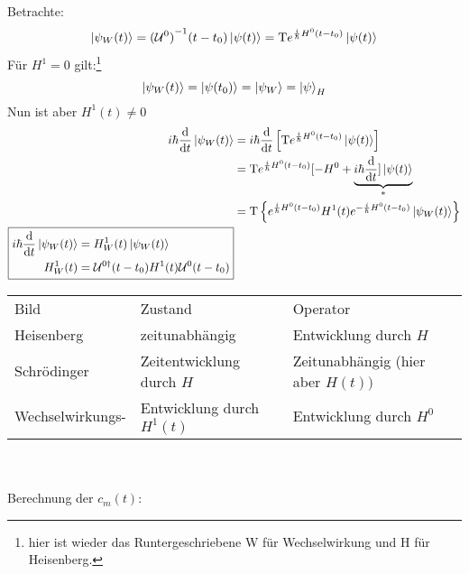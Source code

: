 	Betrachte:
		\begin{equation*}
			\ket{\psi_W(t)} = {(\mathcal{U}^0)}^{-1} (t-t_0) \ket{\psi(t)} 
			= \text{T} e^{\frac{i}{\hbar} H^0 (t-t_0)} \ket{\psi(t)} 
		\end{equation*}
	Für $H^1=0$ gilt:\footnote{hier ist wieder das Runtergeschriebene W für Wechselwirkung und H für Heisenberg.}
		\begin{equation*}
			\ket{\psi_W(t)} = \ket{\psi(t_0)} = \ket{\psi_W} = \ket{\psi}_H
		\end{equation*}
	Nun ist aber $H^1(t) \neq 0$
		\begin{align}
			i\hbar \frac{\mathrm{d}}{\mathrm{d} t} \ket{\psi_W(t)} &=
			i\hbar \frac{\mathrm{d}}{\mathrm{d} t} \left[\text{T} e^{\frac{i}{\hbar} H^0(t-t_0)} \ket{\psi(t)}\right] \nonumber \\ \nonumber
			&= \text{T} e^{\frac{i}{\hbar} H^0(t-t_0)} [ -H^0 + \underbrace{i\hbar \frac{\mathrm{d}}{\mathrm{d} t}] \ket{\psi(t)}}_{\substack{*}} \\ \nonumber
			&= \text{T} \left\{ e^{\frac{i}{\hbar} H^0(t-t_0)} H^1(t) e^{-\frac{i}{\hbar} H^0(t-t_0)} \ket{\psi_W(t)}\right\}  \\ 
			\boxed{
		\begin{aligned}i\hbar \frac{\mathrm{d}}{\mathrm{d} t} \ket{\psi_W(t)} 
				&= H^1_W(t) \ket{\psi_W(t)}  \\ 
				H^1_W(t)& = \mathcal{U}^{0\dagger} (t-t_0) H^1(t) \mathcal{U}^0(t-t_0) 
		\end{aligned}
			} \label{Wechselwirkung}
		\end{align}
		\begin{tabular*}{\linewidth}{l l l}
			Bild & Zustand & Operator \\
			Heisenberg & zeitunabhängig & Entwicklung durch $H$ \\
			Schrödinger & Zeitentwicklung durch $H$ & Zeitunabhängig (hier aber $H(t))$ \\
			Wechselwirkungs- & Entwicklung durch $H^1(t)$ & Entwicklung durch $H^0$
		\end{tabular*} %
		 \\ \\
	Berechnung der $c_m(t)$:
	
